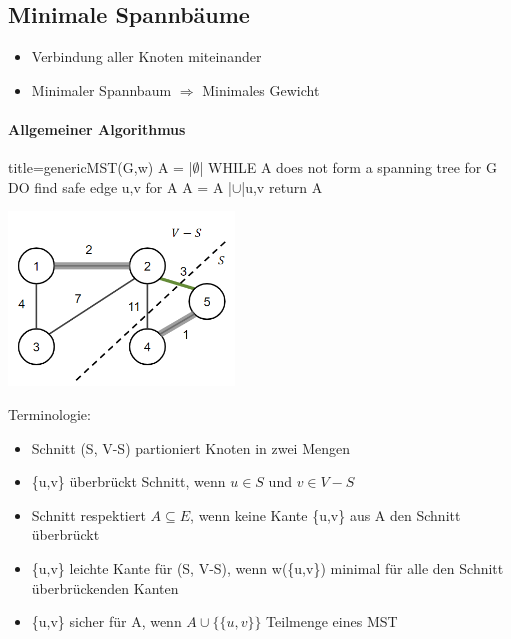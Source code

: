 \documentclass[
    ngerman,
    color=3b,
    dark_mode,
    load_common, %
    summary,
    boxarc,
]{tuda_summary}
\begin{document}
\clearpage
\subsection{Minimale Spannbäume}
\begin{definition}\mbox{}
    \begin{itemize}
        \item Verbindung aller Knoten miteinander
        \item Minimaler Spannbaum $\Rightarrow$ Minimales Gewicht
    \end{itemize}
\end{definition}

\paragraph{Allgemeiner Algorithmus}\mbox{}
\begin{codeBlock}[autogobble,escapeinside=||]{title={genericMST(G,w)}}
A = |$\emptyset$|
WHILE A does not form a spanning tree for G DO
    find safe edge {u,v} for A
    A = A |$\cup$|{{u,v}}
return A
\end{codeBlock}
\begin{minipage}{0.35\textwidth}
    \includegraphics[width=6cm]{pictures/mstTerm.PNG}
\end{minipage}
\begin{minipage}{0.55\textwidth}
    Terminologie:
    \begin{itemize}
        \item Schnitt (S, V-S) partioniert Knoten in zwei Mengen
        \item \{u,v\} überbrückt Schnitt, wenn $u \in S$ und $v \in V-S$
        \item Schnitt respektiert $A \subseteq E$, wenn keine Kante \{u,v\} aus A den Schnitt überbrückt
        \item \{u,v\} leichte Kante für (S, V-S), wenn w(\{u,v\}) minimal für alle den Schnitt überbrückenden Kanten
        \item \{u,v\} sicher für A, wenn $A \cup \{\{u,v\}\}$ Teilmenge eines MST
    \end{itemize}
\end{minipage}
\end{document}
